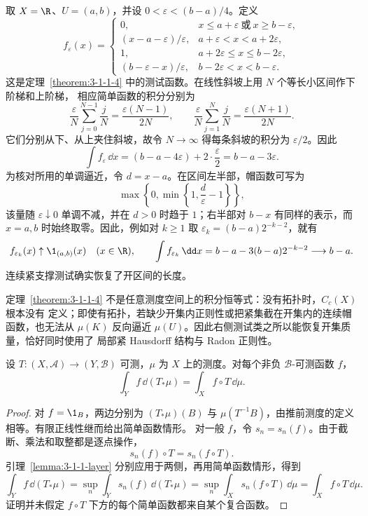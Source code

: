 \begin{example}[区间上的帽函数]\label{ex:3-1-1-radon-hat}
取 $X=\R$、$U=(a,b)$，并设 $0<\varepsilon<(b-a)/4$。定义
\[
 f_\varepsilon(x)=
 \begin{cases}
 0,&x\leq a+\varepsilon\ \text{或}\ x\geq b-\varepsilon,\\
 (x-a-\varepsilon)/\varepsilon,&a+\varepsilon<x<a+2\varepsilon,\\
 1,&a+2\varepsilon\leq x\leq b-2\varepsilon,\\
 (b-\varepsilon-x)/\varepsilon,&b-2\varepsilon<x<b-\varepsilon.
 \end{cases}
\]
这是定理~\ref{theorem:3-1-1-4} 中的测试函数。在线性斜坡上用 $N$ 个等长小区间作下阶梯和上阶梯，
相应简单函数的积分分别为
\[
 \frac{\varepsilon}{N}\sum_{j=0}^{N-1}\frac jN
 =\frac{\varepsilon(N-1)}{2N},
 \qquad
 \frac{\varepsilon}{N}\sum_{j=1}^{N}\frac jN
 =\frac{\varepsilon(N+1)}{2N}.
\]
它们分别从下、从上夹住斜坡，故令 $N\to\infty$ 得每条斜坡的积分为 $\varepsilon/2$。因此
\[
 \int f_\varepsilon\,\dd x
 =(b-a-4\varepsilon)+2\cdot\frac{\varepsilon}{2}
 =b-a-3\varepsilon.
\]
为核对所用的单调逼近，令 $d=x-a$。在区间左半部，帽函数可写为
\[
 \max\left\{0,\min\left\{1,\frac d\varepsilon-1\right\}\right\},
\]
该量随 $\varepsilon\downarrow0$ 单调不减，并在 $d>0$ 时趋于 $1$；右半部对
$b-x$ 有同样的表示，而 $x=a,b$ 时始终取零。因此，例如对 $k\geq1$ 取
$\varepsilon_k=(b-a)2^{-k-2}$，就有
\[
 f_{\varepsilon_k}(x)\uparrow\1_{(a,b)}(x)
 \quad(x\in\R),
 \qquad
 \int f_{\varepsilon_k}\,\dd x
 =b-a-3(b-a)2^{-k-2}\longrightarrow b-a.
\]
连续紧支撑测试确实恢复了开区间的长度。
\end{example}

\begin{remark}[拓扑与正则性确实参与了公式]
定理~\ref{theorem:3-1-1-4} 不是任意测度空间上的积分恒等式：没有拓扑时，$C_c(X)$ 根本没有
定义；即使有拓扑，若缺少开集内正则性或把紧集截在开集内的连续帽函数，也无法从
$\mu(K)$ 反向逼近 $\mu(U)$。因此右侧测试类之所以能恢复开集质量，恰好同时使用了
局部紧 Hausdorff 结构与 Radon 正则性。
\end{remark}

\begin{proposition}[非负推前积分公式]\label{proposition:3-1-1-5}
设 $T:(X,\mathcal A)\to(Y,\mathcal B)$ 可测，$\mu$ 为 $X$ 上的测度。对每个非负
$\mathcal B$-可测函数 $f$，
\[
 \int_Y f\,\dd(T_*\mu)=\int_Xf\circ T\,\dd\mu.
 \tag{3.1.8}\label{eq:3-1-pushforward-positive}
\]
\end{proposition}

\begin{proof}
对 $f=\1_B$，两边分别为
$(T_*\mu)(B)$ 与 $\mu(T^{-1}B)$，由推前测度的定义相等。有限正线性继而给出简单函数情形。
对一般 $f$，令 $s_n=s_n(f)$。由于截断、乘法和取整都是逐点操作，
\[
 s_n(f)\circ T=s_n(f\circ T).
\]
引理~\ref{lemma:3-1-1-layer} 分别应用于两侧，再用简单函数情形，得到
\[
 \int_Yf\,\dd(T_*\mu)
 =\sup_n\int_Ys_n(f)\,\dd(T_*\mu)
 =\sup_n\int_Xs_n(f\circ T)\,\dd\mu
 =\int_Xf\circ T\,\dd\mu.
\]
证明并未假定 $f\circ T$ 下方的每个简单函数都来自某个复合函数。
\end{proof}

